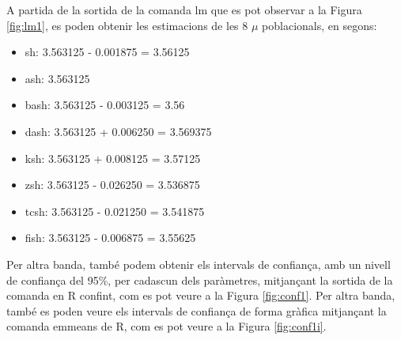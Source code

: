 \documentclass[12pt]{article}
\begin{document}
A partida de la sortida de la comanda lm que es pot observar a la Figura \ref{fig:lm1}, es poden obtenir les estimacions
de les 8 $\mu$ poblacionals, en segons:
\begin{itemize}
  \item sh: 3.563125 - 0.001875 = 3.56125
  \item ash: 3.563125
  \item bash: 3.563125 - 0.003125 = 3.56
  \item dash: 3.563125 + 0.006250 = 3.569375
  \item ksh: 3.563125 + 0.008125 = 3.57125
  \item zsh: 3.563125 - 0.026250 = 3.536875
  \item tcsh: 3.563125 - 0.021250 = 3.541875
  \item fish: 3.563125 - 0.006875 = 3.55625 
\end{itemize}
\hfill \break
Per altra banda, també podem obtenir els intervals de confiança, amb un nivell de confiança del 95\%, per cadascun dels paràmetres,
mitjançant la sortida de la comanda en R confint, com es pot veure a la Figura \ref{fig:conf1}. Per altra banda, també es poden veure
els intervals de confiança de forma gràfica mitjançant la comanda emmeans de R, com es pot veure a la Figura \ref{fig:conf1i}.
\end{document}
